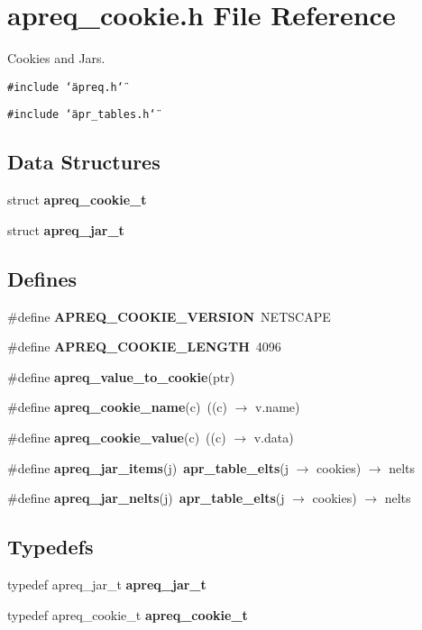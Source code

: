 \section{apreq\_\-cookie.h File Reference}
\label{apreq__cookie_8h}
Cookies and Jars. 


{\tt \#include \char`\"{}apreq.h\char`\"{}}\par
{\tt \#include \char`\"{}apr\_\-tables.h\char`\"{}}\par
\subsection*{Data Structures}
\begin{CompactItemize}
\item 
struct {\bf apreq\_\-cookie\_\-t}
\item 
struct {\bf apreq\_\-jar\_\-t}
\end{CompactItemize}
\subsection*{Defines}
\begin{CompactItemize}
\item 
\#define {\bf APREQ\_\-COOKIE\_\-VERSION}\ NETSCAPE\label{apreq__cookie_8h_a13}

\item 
\#define {\bf APREQ\_\-COOKIE\_\-LENGTH}\ 4096\label{apreq__cookie_8h_a14}

\item 
\#define {\bf apreq\_\-value\_\-to\_\-cookie}(ptr)
\item 
\#define {\bf apreq\_\-cookie\_\-name}(c)\ ((c) $\rightarrow$ v.name)\label{apreq__cookie_8h_a16}

\item 
\#define {\bf apreq\_\-cookie\_\-value}(c)\ ((c) $\rightarrow$ v.data)\label{apreq__cookie_8h_a17}

\item 
\#define {\bf apreq\_\-jar\_\-items}(j)\ {\bf apr\_\-table\_\-elts}(j $\rightarrow$ cookies) $\rightarrow$ nelts\label{apreq__cookie_8h_a18}

\item 
\#define {\bf apreq\_\-jar\_\-nelts}(j)\ {\bf apr\_\-table\_\-elts}(j $\rightarrow$ cookies) $\rightarrow$ nelts\label{apreq__cookie_8h_a19}

\end{CompactItemize}
\subsection*{Typedefs}
\begin{CompactItemize}
\item 
typedef apreq\_\-jar\_\-t {\bf apreq\_\-jar\_\-t}
\item 
typedef apreq\_\-cookie\_\-t {\bf apreq\_\-cookie\_\-t}
\end{CompactItemize}
